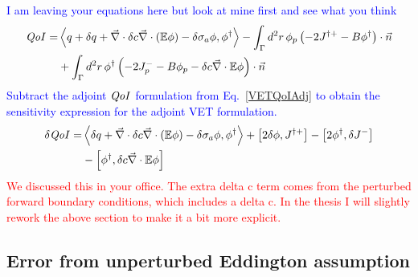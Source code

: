 \documentclass{article}
\newcommand{\bra}{\left\langle}
\newcommand{\ket}{\right\rangle}
\newcommand{\sbra}{\left[}
\newcommand{\sket}{\right]}
\renewcommand{\div}{\vec{\nabla} \cdot}
\newcommand{\Edd}{\mathbb{E}}
\newcommand{\siga}{\sigma_a}
\newcommand{\isigt}{c}
\newcommand{\scalSource}{q}
\newcommand{\qoi}{{\it QoI}\xspace}
\newcommand{\comment}[2]{\marginpar{\textcolor{#2}{$\star$}}\textcolor{#2}{#1}\newline}
\newcommand{\iwh}[1]{\comment{#1}{red}}
\newcommand{\jcr}[1]{\comment{#1}{blue}}
\newcommand{\iwh}[1]{\phantom{a}}
\newcommand{\jcr}[1]{\phantom{a}}
\begin{document}
\jcr{I am leaving your equations here but look at mine first and see what you think
\begin{equation}
\begin{split}
\qoi =& \bra \scalSource + \delta \scalSource + \div \delta \isigt \div \left( \Edd \phi \right) - \delta \siga \phi, \phi^\dag \ket - \int_\Gamma d^2 r \, \phi_p \left( - 2J^{\dag +} - B \phi^\dag \right) \cdot \vec{n} 
\\ &+ \int_\Gamma d^2 r \, \phi^\dag \left( - 2J_p^- - B \phi_p - \delta \isigt \div \Edd \phi \right) \cdot \vec{n} 
\end{split}
\end{equation}
Subtract the adjoint $\qoi$ formulation from Eq.~\eqref{VETQoIAdj} to obtain the sensitivity expression for the adjoint VET formulation.
\begin{equation}
\begin{split}
\delta \qoi =& \bra \delta \scalSource + \div \delta \isigt \div \left( \Edd \phi \right) - \delta \siga \phi, \phi^\dag \ket + \sbra 2\delta \phi, J^{\dag +} \sket  - \sbra 2\phi^\dag, \delta J^- \sket
\\ &- \sbra \phi^\dag, \delta \isigt \div \Edd \phi \sket
\end{split}
\end{equation}
}
\iwh{We discussed this in your office. The extra delta c term comes from the perturbed forward boundary conditions, which includes a delta c. In the thesis I will slightly rework the above section to make it a bit more explicit.}

\subsection{Error from unperturbed Eddington assumption}
\end{document}
